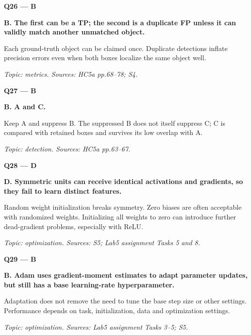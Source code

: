 \documentclass[11pt,a4paper]{article}
\begin{document}
\par\vspace{12pt}
\begin{minipage}{\linewidth}
\textbf{Q26 — B}\par\smallskip
\textbf{B. The first can be a TP; the second is a duplicate FP unless it can validly match another unmatched object.}\par
Each ground-truth object can be claimed once. Duplicate detections inflate precision errors even when both boxes localize the same object well.\par
{\small\itshape Topic: metrics. Sources: HC5a pp.68–78; S4.}

\end{minipage}
\par\vspace{12pt}
\begin{minipage}{\linewidth}
\textbf{Q27 — B}\par\smallskip
\textbf{B. A and C.}\par
Keep A and suppress B. The suppressed B does not itself suppress C; C is compared with retained boxes and survives its low overlap with A.\par
{\small\itshape Topic: detection. Sources: HC5a pp.63–67.}

\end{minipage}
\par\vspace{12pt}
\begin{minipage}{\linewidth}
\textbf{Q28 — D}\par\smallskip
\textbf{D. Symmetric units can receive identical activations and gradients,\allowbreak{} so they fail to learn distinct features.}\par
Random weight initialization breaks symmetry. Zero biases are often acceptable with randomized weights. Initializing all weights to zero can introduce further dead-gradient problems,\allowbreak{} especially with ReLU.\par
{\small\itshape Topic: optimization. Sources: S5; Lab5 assignment Tasks 5 and 8.}

\end{minipage}
\par\vspace{12pt}
\begin{minipage}{\linewidth}
\textbf{Q29 — B}\par\smallskip
\textbf{B. Adam uses gradient-moment estimates to adapt parameter updates,\allowbreak{} but still has a base learning-rate hyperparameter.}\par
Adaptation does not remove the need to tune the base step size or other settings. Performance depends on task,\allowbreak{} initialization,\allowbreak{} data and optimization settings.\par
{\small\itshape Topic: optimization. Sources: Lab5 assignment Tasks 3–5; S5.}

\end{minipage}
\end{document}
